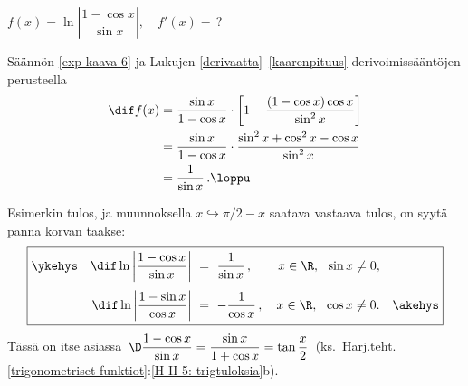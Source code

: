 \begin{Exa}
$f(x)=\ln\left|\dfrac{1-\cos x}{\sin x}\right|, \quad f'(x)=\,$?
\end{Exa}
\ratk Säännön \eqref{exp-kaava 6} ja Lukujen \ref{derivaatta}--\ref{kaarenpituus}
derivoimissääntöjen perusteella
\begin{align*}
\dif f(x)&=\frac{\sin x}{1-\cos x}\cdot \left[1-\frac{(1-\cos x)\cos x}{\sin^2 x}\right] \\
         &=\frac{\sin x}{1-\cos x}\cdot\frac{\sin^2 x+\cos^2 x-\cos x}{\sin^2 x} \\
         &=\frac{1}{\sin x}\,. \loppu
\end{align*}

Esimerkin tulos, ja muunnoksella $x\hookrightarrow\pi/2-x$ saatava vastaava tulos, on syytä 
panna korvan taakse:
\[ \boxed{
\begin{aligned}
\ykehys\quad \dif\ln\left|\dfrac{1-\cos x}{\sin x}\right|\ 
                 &=\ \dfrac{1}{\sin x}\,, \quad\quad x\in\R,\ \ \sin x\neq 0, \\[1mm]
             \dif\ln\left|\dfrac{1-\sin x}{\cos x}\right|\ 
                 &=\ -\dfrac{1}{\cos x}\,, \quad x\in\R,\ \ \cos x\neq 0. \quad\akehys
\end{aligned} } \]
Tässä on itse asiassa
$\,\D \dfrac{1-\cos x}{\sin x} = \dfrac{\sin x}{1+\cos x}=\tan\dfrac{x}{2}\,$
(ks.\ Harj.teht.\,\ref{trigonometriset funktiot}:\ref{H-II-5: trigtuloksia}b).

